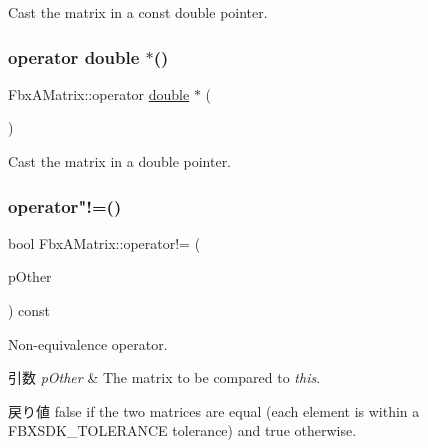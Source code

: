 Cast the matrix in a const double pointer. 

\mbox{\label{class_fbx_a_matrix_a84e411ebdbdf3be933b1db42109da89f}} 
\subsubsection{\texorpdfstring{operator double $\ast$()}{operator double *()}}
{\footnotesize\ttfamily Fbx\+A\+Matrix\+::operator \hyperlink{class_fbx_a_matrix_ad463edbb9fea344643297701f159faa7}{double} $\ast$ (\begin{DoxyParamCaption}{ }\end{DoxyParamCaption})}



Cast the matrix in a double pointer. 

\mbox{\label{class_fbx_a_matrix_a74905b993a9a8a22f8f55024b40be856}} 
\subsubsection{\texorpdfstring{operator"!=()}{operator!=()}}
{\footnotesize\ttfamily bool Fbx\+A\+Matrix\+::operator!= (\begin{DoxyParamCaption}\item[{const \hyperlink{class_fbx_a_matrix}{Fbx\+A\+Matrix} \&}]{p\+Other }\end{DoxyParamCaption}) const}

Non-\/equivalence operator. 
\begin{DoxyParams}{引数}
{\em p\+Other} & The matrix to be compared to {\itshape this}. \\
\hline
\end{DoxyParams}
\begin{DoxyReturn}{戻り値}
{\ttfamily false} if the two matrices are equal (each element is within a F\+B\+X\+S\+D\+K\+\_\+\+T\+O\+L\+E\+R\+A\+N\+CE tolerance) and {\ttfamily true} otherwise. 
\end{DoxyReturn}
\mbox{\label{class_fbx_a_matrix_abc19f68d91ce2dd5303c9ab398e12eee}} 
